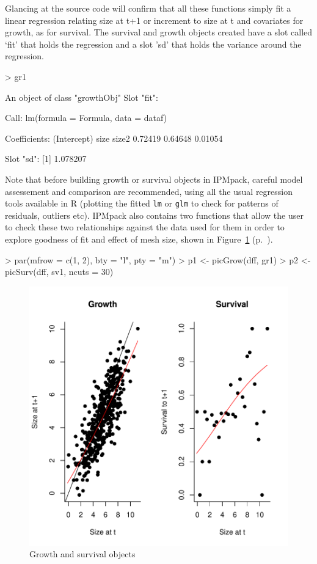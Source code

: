 \documentclass{article}
\begin{document}
Glancing at the source code will confirm that all these functions simply fit a linear regression relating size at t+1 or increment to size at t and covariates for growth, as for survival. The survival and growth objects created have a slot called `fit' that holds the regression and a slot 'sd' that holds the variance around the regression. 
\begin{Schunk}
\begin{Sinput}
> gr1
\end{Sinput}
\begin{Soutput}
An object of class "growthObj"
Slot "fit":

Call:
lm(formula = Formula, data = dataf)

Coefficients:
(Intercept)         size        size2  
    0.72419      0.64648      0.01054  


Slot "sd":
[1] 1.078207
\end{Soutput}
\end{Schunk}
Note that before building growth or survival objects in IPMpack, careful model assessement and comparison are recommended, using all the usual regression tools available in R (plotting the fitted {\tt lm} or {\tt glm} to check for patterns of residuals, outliers etc). IPMpack also contains two functions that allow the user to check these two relationships against the data used for them in order to explore goodness of fit and effect of mesh size, shown in Figure~\ref{fig:one} (p.~\pageref{fig:one}).
\begin{Schunk}
\begin{Sinput}
> par(mfrow = c(1, 2), bty = "l", pty = "m")
> p1 <- picGrow(dff, gr1)
> p2 <- picSurv(dff, sv1, ncuts = 30)
\end{Sinput}
\end{Schunk}
\begin{figure}
\begin{center}
\includegraphics{IPMpack_Vignette-fig1}
\end{center}
\caption{Growth and survival objects}
\label{fig:one}
\end{figure}
\end{document}

